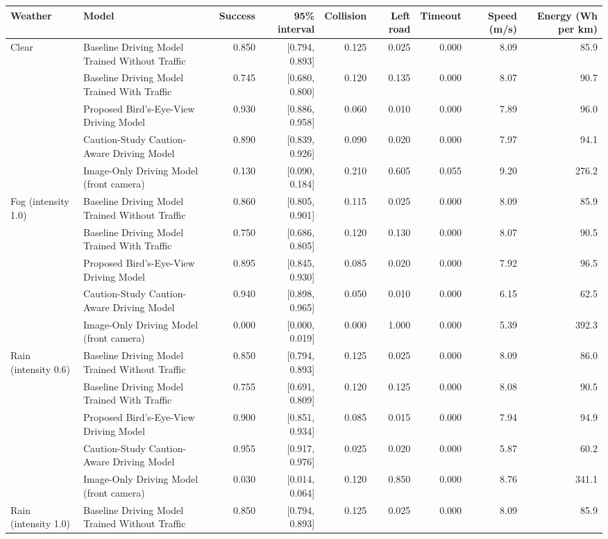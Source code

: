 \begin{tabular}{@{}llrrrrrrr@{}}\toprule
Weather & Model & Success & 95\% interval & Collision & Left road & Timeout & Speed (m/s) & Energy (Wh per km)\\\midrule
Clear & Baseline Driving Model Trained Without Traffic & 0.850 & [0.794, 0.893] & 0.125 & 0.025 & 0.000 & 8.09 & 85.9\\
 & Baseline Driving Model Trained With Traffic & 0.745 & [0.680, 0.800] & 0.120 & 0.135 & 0.000 & 8.07 & 90.7\\
 & Proposed Bird's-Eye-View Driving Model & 0.930 & [0.886, 0.958] & 0.060 & 0.010 & 0.000 & 7.89 & 96.0\\
 & Caution-Study Caution-Aware Driving Model & 0.890 & [0.839, 0.926] & 0.090 & 0.020 & 0.000 & 7.97 & 94.1\\
 & Image-Only Driving Model (front camera) & 0.130 & [0.090, 0.184] & 0.210 & 0.605 & 0.055 & 9.20 & 276.2\\
\midrule
Fog (intensity 1.0) & Baseline Driving Model Trained Without Traffic & 0.860 & [0.805, 0.901] & 0.115 & 0.025 & 0.000 & 8.09 & 85.9\\
 & Baseline Driving Model Trained With Traffic & 0.750 & [0.686, 0.805] & 0.120 & 0.130 & 0.000 & 8.07 & 90.5\\
 & Proposed Bird's-Eye-View Driving Model & 0.895 & [0.845, 0.930] & 0.085 & 0.020 & 0.000 & 7.92 & 96.5\\
 & Caution-Study Caution-Aware Driving Model & 0.940 & [0.898, 0.965] & 0.050 & 0.010 & 0.000 & 6.15 & 62.5\\
 & Image-Only Driving Model (front camera) & 0.000 & [0.000, 0.019] & 0.000 & 1.000 & 0.000 & 5.39 & 392.3\\
\midrule
Rain (intensity 0.6) & Baseline Driving Model Trained Without Traffic & 0.850 & [0.794, 0.893] & 0.125 & 0.025 & 0.000 & 8.09 & 86.0\\
 & Baseline Driving Model Trained With Traffic & 0.755 & [0.691, 0.809] & 0.120 & 0.125 & 0.000 & 8.08 & 90.5\\
 & Proposed Bird's-Eye-View Driving Model & 0.900 & [0.851, 0.934] & 0.085 & 0.015 & 0.000 & 7.94 & 94.9\\
 & Caution-Study Caution-Aware Driving Model & 0.955 & [0.917, 0.976] & 0.025 & 0.020 & 0.000 & 5.87 & 60.2\\
 & Image-Only Driving Model (front camera) & 0.030 & [0.014, 0.064] & 0.120 & 0.850 & 0.000 & 8.76 & 341.1\\
\midrule
Rain (intensity 1.0) & Baseline Driving Model Trained Without Traffic & 0.850 & [0.794, 0.893] & 0.125 & 0.025 & 0.000 & 8.09 & 85.9\\

\end{tabular}
